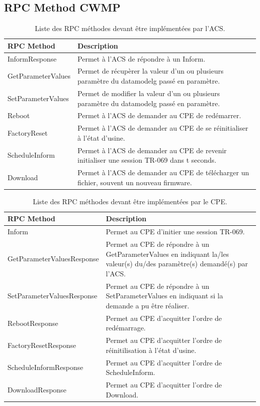 \documentclass[12pt,a4paper]{report}
\begin{document}
\newpage
\begin{appendix}
\chapter{RPC Method CWMP}
\begin{table}
	\begin{tabularx}{17cm}{|l|X|}
		\hline
		RPC Method & Description\tabularnewline
		\hline
		InformResponse & Permet à l'ACS de répondre à un Inform.\tabularnewline
		\hline
		GetParameterValues & Permet de récupèrer la valeur d'un ou plusieurs 				paramètre du \gls{datamodelg} passé en paramètre.\tabularnewline
		\hline
		SetParameterValues & Permet de modifier la valeur d'un ou plusieurs 				paramètre du \gls{datamodelg} passé en paramètre.\tabularnewline
		\hline
		Reboot & Permet à l'ACS de demander au CPE de redémarrer.\tabularnewline
		\hline
		FactoryReset & Permet à l'ACS de demander au CPE de se réinitialiser à l'état d'usine.\tabularnewline
		\hline
		ScheduleInform & Permet à l'ACS de demander au CPE de revenir initialiser une session TR-069 dans t seconds.\tabularnewline
		\hline
		Download & Permet à l'ACS de demander au CPE de télécharger un fichier, souvent un nouveau firmware.\tabularnewline
		\hline
	\end{tabularx}
	\centering
	\caption{Liste des RPC méthodes devant être implémentées par l'ACS.}
\end{table}
\begin{table}
	\begin{tabularx}{17cm}{|l|X|}
		\hline
		RPC Method & Description\tabularnewline
		\hline
		Inform & Permet au CPE d'initier une session TR-069.\tabularnewline
		\hline
		GetParameterValuesResponse & Permet au CPE de répondre à un 						GetParameterValues en indiquant la/les valeur(s) du/des paramètre(s) 				demandé(s) par l'ACS.\tabularnewline
		\hline
		SetParameterValuesResponse & Permet au CPE de répondre à un 						SetParameterValues en indiquant si la demande a pu être réaliser.\tabularnewline
		\hline
		RebootResponse & Permet au CPE d'acquitter l'ordre de redémarrage.\tabularnewline
		\hline
		FactoryResetResponse & Permet au CPE d'acquitter l'ordre de réinitilisation à l'état d'usine.\tabularnewline
		\hline
		ScheduleInformResponse & Permet au CPE d'acquitter l'ordre de ScheduleInform.\tabularnewline
		\hline
		DownloadResponse & Permet au CPE d'acquitter l'ordre de Download.\tabularnewline
		\hline
	\end{tabularx}
	\centering
	\caption{Liste des RPC méthodes devant être implémentées par le CPE.}
\end{table}


\end{appendix}
\end{document}
